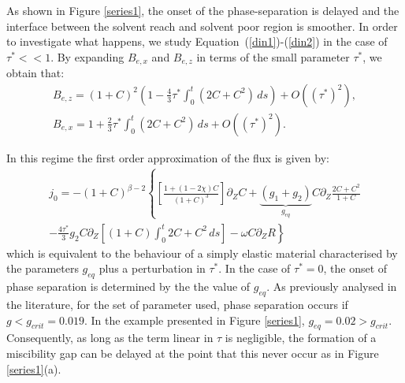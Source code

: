 \documentclass[12pt]{extarticle}
\begin{document}
As shown in Figure \ref{series1}, the onset of the phase-separation is delayed and the interface between the solvent reach and solvent poor region is smoother. In order to investigate what happens, we study Equation~(\ref{din1})-(\ref{din2}) in the case of $\tau^*<<1$. By expanding $B_{e,x}$ and $B_{e,z}$ in terms of the small parameter $\tau^*$, we obtain that:
\begin{equation}
\begin{aligned}
B_{e,z} = (1+C)^2\left(1-\frac{4}{3}\tau^*\int_0^t (2C+C^2)\,ds\right) + O((\tau^*)^2),\\
B_{e,x} = 1+\frac{2}{3}\tau^*\int_0^t (2C+C^2)\,ds + O((\tau^*)^2).
\end{aligned}
\end{equation}

In this regime the first order approximation of the flux is given by:
\begin{equation*}
\begin{aligned}
j_0= -(1+C)^{\beta-2} \left\{\left[\frac{1+(1-2\chi)C}{(1+C)^3}\right]\partial_Z C + \underbrace{(g_1+g_2)}_{g_{eq}}C\partial_Z\frac{2C+C^2}{1+C}\right.\\
\left.-\frac{4\tau^*}{3}g_2 C\partial_Z\left[(1+C)\int_0^t 2C+C^2\, ds\right]-\omega C \partial_Z R\right\}
\end{aligned}
\end{equation*}
which is equivalent to the behaviour of a simply elastic material characterised by the parameters $g_{eq}$ plus a perturbation in $\tau^*$. In the case of $\tau^*=0$, the onset of phase separation is determined by the the value of $g_{eq}$. As previously analysed in the literature, for the set of parameter used, phase separation occurs if $g<g_{crit}=0.019$. In the example presented in Figure \ref{series1}, $g_{eq}=0.02>g_{crit}$. Consequently, as long as the term linear in $\tau$ is negligible, the formation of a miscibility gap can be delayed at the point that this never occur as in Figure \ref{series1}(a).
\end{document}
